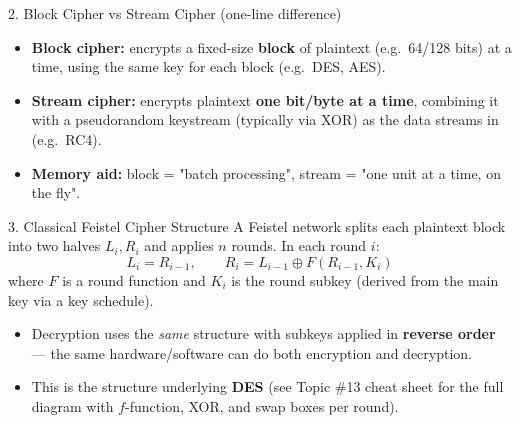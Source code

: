 \documentclass[12pt,a4paper]{article}
\begin{document}
\begin{algobox}{2. Block Cipher vs Stream Cipher (one-line difference)}
\begin{itemize}[noitemsep]
  \item \textbf{Block cipher:} encrypts a fixed-size \textbf{block} of plaintext (e.g.\ 64/128 bits) at a time, using the same key for each block (e.g.\ DES, AES).
  \item \textbf{Stream cipher:} encrypts plaintext \textbf{one bit/byte at a time}, combining it with a pseudorandom keystream (typically via XOR) as the data streams in (e.g.\ RC4).
  \item \textbf{Memory aid:} block = "batch processing", stream = "one unit at a time, on the fly".
\end{itemize}
\end{algobox}

\begin{algobox}{3. Classical Feistel Cipher Structure}
A Feistel network splits each plaintext block into two halves $L_i, R_i$ and applies $n$ rounds. In each round $i$:
\[
L_i = R_{i-1}, \qquad R_i = L_{i-1} \oplus F(R_{i-1}, K_i)
\]
where $F$ is a round function and $K_i$ is the round subkey (derived from the main key via a key schedule).
\begin{itemize}[noitemsep]
  \item Decryption uses the \emph{same} structure with subkeys applied in \textbf{reverse order} --- the same hardware/software can do both encryption and decryption.
  \item This is the structure underlying \textbf{DES} (see Topic \#13 cheat sheet for the full diagram with $f$-function, XOR, and swap boxes per round).
\end{itemize}
\end{algobox}
\end{document}
